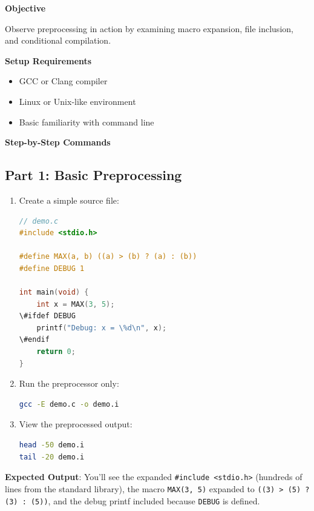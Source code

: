 \begin{experiment}
\textbf{Objective}

Observe preprocessing in action by examining macro expansion, file inclusion, and conditional compilation.

\textbf{Setup Requirements}

\begin{itemize}
    \item GCC or Clang compiler
    \item Linux or Unix-like environment
    \item Basic familiarity with command line
\end{itemize}

\textbf{Step-by-Step Commands}

\subsection{Part 1: Basic Preprocessing}

\begin{enumerate}
    \item Create a simple source file:

\begin{lstlisting}[language=C]
// demo.c
#include <stdio.h>

#define MAX(a, b) ((a) > (b) ? (a) : (b))
#define DEBUG 1

int main(void) {
    int x = MAX(3, 5);
\#ifdef DEBUG
    printf("Debug: x = \%d\n", x);
\#endif
    return 0;
}
\end{lstlisting}

    \item Run the preprocessor only:

\begin{lstlisting}[language=bash]
gcc -E demo.c -o demo.i
\end{lstlisting}

    \item View the preprocessed output:

\begin{lstlisting}[language=bash]
head -50 demo.i
tail -20 demo.i
\end{lstlisting}
\end{enumerate}

\textbf{Expected Output}: You'll see the expanded \texttt{\#include <stdio.h>} (hundreds of lines from the standard library), the macro \texttt{MAX(3, 5)} expanded to \texttt{((3) > (5) ? (3) : (5))}, and the debug printf included because \texttt{DEBUG} is defined.


\end{experiment}

